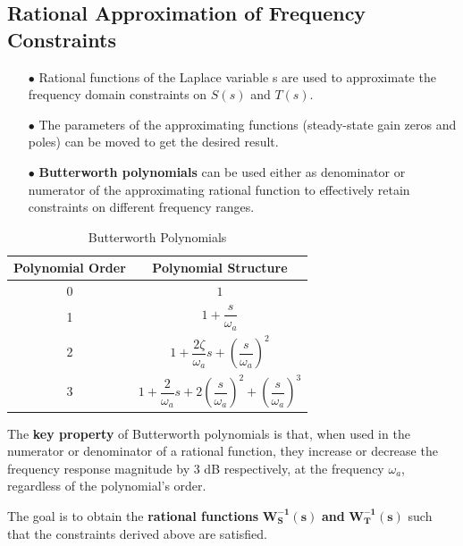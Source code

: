 \documentclass{article}
\numberwithin{equation}{subsection}
\begin{document}
	\subsection{Rational Approximation of Frequency Constraints}
	\begin{enumerate}
		\item[$\bullet$] Rational functions of the Laplace variable s are used to approximate the frequency domain constraints on $S(s)$ and $T(s)$.
		\item[$\bullet$] The parameters of the approximating functions (steady-state gain zeros and poles) can be moved to get the desired result.
		\item[$\bullet$] \textbf{Butterworth polynomials} can be used either as denominator or numerator of the approximating rational function to effectively retain constraints on different frequency ranges.
	\end{enumerate}
	\begin{table}[H] %
		\begin{minipage}{0.45\textwidth} %
			\centering
			\begin{tabular}{|c|c|}
				\hline
				\textbf{Polynomial Order} & \textbf{Polynomial Structure} \\ \hline
				0 & $1$ \\ \hline
				1 & $1+\dfrac{s}{\omega_a}$ \\ \hline
				2 & $1+\dfrac{2\zeta}{\omega_a}s+\left(\dfrac{s}{\omega_a}\right)^2$ \\ \hline
				3 & $1+\dfrac{2}{\omega_a}s+2\left(\dfrac{s}{\omega_a}\right)^2+\left(\dfrac{s}{\omega_a}\right)^3$ \\ \hline
			\end{tabular}
			\caption{Butterworth Polynomials}
			\label{tab:polynomial_table}
		\end{minipage}
		\hfill
		\begin{minipage}{0.5\textwidth}
			\raggedright
			\vspace{-54pt}
			The \textbf{key property} of Butterworth polynomials is that, when used in the numerator or denominator of a rational function, they increase or decrease the frequency response magnitude by 3 dB respectively, at the frequency $\omega_a$, regardless of the polynomial's order.
		\end{minipage}
	\end{table}
	The goal is to obtain the \textbf{rational functions} $\bm{W_S^{-1}(s)}$ \textbf{and} $\bm{W_T^{-1}(s)}$ such that the constraints derived above are satisfied.
\end{document}
